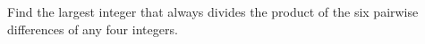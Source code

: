 Find the largest integer that always divides the product of the six pairwise differences of any four integers.
